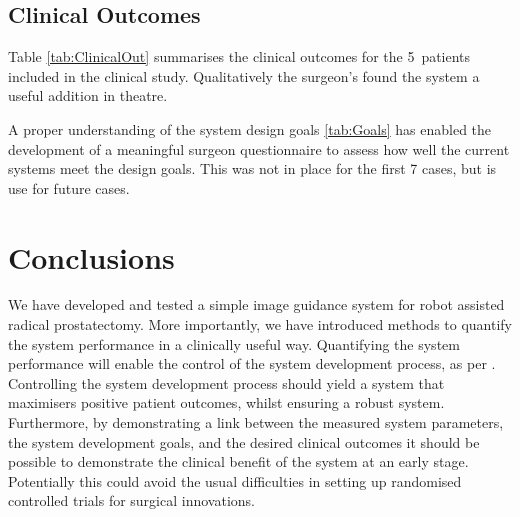 \documentclass[3p,twocolumn,preprint,10pt]{elsarticle}
\newcommand{\n}{5}
\begin{document}




\subsection{Clinical Outcomes}
Table \ref{tab:ClinicalOut} summarises the clinical outcomes for the \n \ patients 
included in the clinical study. Qualitatively the surgeon's found the system 
a useful addition in theatre. 

A proper understanding of the system design goals \ref{tab:Goals} has enabled the development
of a meaningful surgeon questionnaire to assess how well the current systems meet the design 
goals. This was not in place for the first 7 cases, but is use for future cases.
\section{Conclusions}
We have developed and tested a simple image guidance system for robot assisted radical prostatectomy. 
More importantly, we have introduced methods to quantify the system performance in a clinically useful way. 
Quantifying the system performance will enable the control of the system development process, as per
\cite{pap264}. Controlling the system development process should yield a system that maximisers 
positive patient outcomes, whilst ensuring a robust system. Furthermore, by demonstrating a link 
between the measured system parameters, the system development goals, and the 
desired clinical outcomes it should be possible 
to demonstrate the clinical benefit of the system at an early stage. Potentially this could 
avoid the
usual difficulties in setting up randomised controlled trials for surgical innovations.



\end{document}
